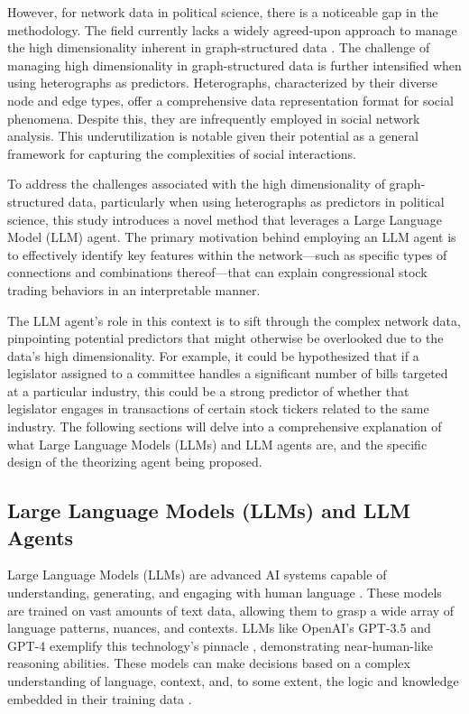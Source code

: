 \documentclass[15pt,letterpaper]{article}
\begin{document}
However, for network data in political science, 
there is a noticeable gap in the methodology. 
The field currently lacks a widely agreed-upon approach to manage the high dimensionality inherent in graph-structured data \citep{Lazer2011NetworksIP,Ward2011NetworkAA}. 
The challenge of managing high dimensionality in graph-structured data is further intensified when using heterographs as predictors. Heterographs, characterized by their diverse node and edge types, offer a comprehensive data representation format for social phenomena. Despite this, they are infrequently employed in social network analysis. This underutilization is notable given their potential as a general framework for capturing the complexities of social interactions.

To address the challenges associated with the high dimensionality of graph-structured data, particularly when using heterographs as predictors in political science, this study introduces a novel method that leverages a Large Language Model (LLM) agent. The primary motivation behind employing an LLM agent is to effectively identify key features within the network—such as specific types of connections and combinations thereof—that can explain congressional stock trading behaviors in an interpretable manner.

The LLM agent's role in this context is to sift through the complex network data, pinpointing potential predictors that might otherwise be overlooked due to the data's high dimensionality. For example, it could be hypothesized that if a legislator assigned to a committee handles a significant number of bills targeted at a particular industry, this could be a strong predictor of whether that legislator engages in transactions of certain stock tickers related to the same industry.
The following sections will delve into a comprehensive explanation of what Large Language Models (LLMs) and LLM agents are, and the specific design of the theorizing agent being proposed.

\subsection{Large Language Models (LLMs) and LLM Agents}

Large Language Models (LLMs) are advanced AI systems capable of understanding, generating, and engaging with human language  \citep{Zhao2023ASO}. 
These models are trained on vast amounts of text data, allowing them to grasp a wide array of language patterns, nuances, and contexts. LLMs like OpenAI's GPT-3.5 and GPT-4 exemplify this technology's pinnacle \citep{Radford2018ImprovingLU}, demonstrating near-human-like reasoning abilities. These models can make decisions based on a complex understanding of language, context, and, to some extent, the logic and knowledge embedded in their training data \citep{Lampinen2022CanLM}.
\end{document}

